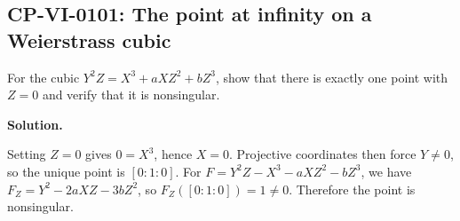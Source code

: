 
\subsection*{CP-VI-0101: The point at infinity on a Weierstrass cubic}

For the cubic $Y^2Z=X^3+aXZ^2+bZ^3$, show that there is exactly one point with $Z=0$ and verify that it is nonsingular.

\medskip
\noindent\textbf{Solution.}

Setting $Z=0$ gives $0=X^3$, hence $X=0$. Projective coordinates then force $Y\ne0$, so the unique point is $[0:1:0]$. For $F=Y^2Z-X^3-aXZ^2-bZ^3$, we have $F_Z=Y^2-2aXZ-3bZ^2$, so $F_Z([0:1:0])=1\ne0$. Therefore the point is nonsingular.
